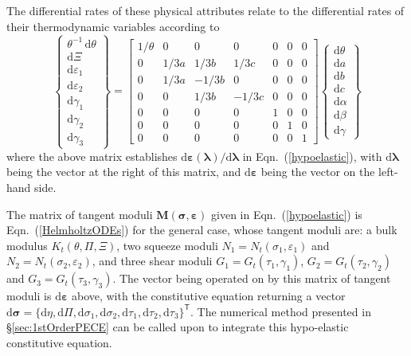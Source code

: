 The differential rates of these physical attributes relate to the differential rates of their thermo\-dynamic variables according to
\begin{equation}
    \left\{ \begin{matrix}
    \theta^{-1} \, \mathrm{d} \theta \\ \mathrm{d} \Xi \\ \mathrm{d} \varepsilon_1 \\
    \mathrm{d} \varepsilon_2 \\ \mathrm{d} \gamma_1 \\ \mathrm{d} \gamma_2 \\
    \mathrm{d} \gamma_3
    \end{matrix} \right\} = \begin{bmatrix}
    1 / \theta & 0 & 0 & 0 & 0 & 0 & 0 \\
    0 & 1/3a & 1/3b & 1/3c & 0 & 0 & 0 \\
    0 & 1/3a & -1/3b & 0 & 0 & 0 & 0 \\
    0 & 0 & 1/3b & -1/3c & 0 & 0 & 0 \\
    0 & 0 & 0 & 0 & 1 & 0 & 0 \\
    0 & 0 & 0 & 0 & 0 & 1 & 0 \\
    0 & 0 & 0 & 0 & 0 & 0 & 1
    \end{bmatrix} \left\{ \begin{matrix}
    \mathrm{d} \theta \\ \mathrm{d} a \\ \mathrm{d} b \\ \mathrm{d} c \\
    \mathrm{d} \alpha \\ \mathrm{d} \beta \\ \mathrm{d} \gamma
    \end{matrix} \right\}
\end{equation}
where the above matrix establishes $\mathrm{d} \boldsymbol{\varepsilon} ( \boldsymbol{\lambda} ) / \mathrm{d} \boldsymbol{\lambda}$ in Eqn.~(\ref{hypoelastic}), with $\mathrm{d} \boldsymbol{\lambda}$ being the vector at the right of this matrix, and $\mathrm{d} \boldsymbol{\varepsilon}$ being the vector on the left-hand side. 

The matrix of tangent moduli $\mathbf{M} ( \boldsymbol{\sigma} , \boldsymbol{\varepsilon} )$ given in Eqn.~(\ref{hypoelastic}) is Eqn.~(\ref{HelmholtzODEs}) for the general case, whose tangent moduli are: a bulk modulus $K_t (\theta , \Pi , \Xi)$, two squeeze moduli $N_1 = N_t ( \sigma_1 , \varepsilon_1 )$ and $N_2 = N_t ( \sigma_2 , \varepsilon_2 )$, and three shear moduli $G_1 = G_t ( \tau_1 , \gamma_1 )$, $G_2 = G_t ( \tau_2 , \gamma_2 )$ and $G_3 = G_t ( \tau_3 , \gamma_3 )$.  The vector being operated on by this matrix of tangent moduli is $\mathrm{d} \boldsymbol{\varepsilon}$ above, with the constitutive equation returning a vector $\mathrm{d} \boldsymbol{\sigma} = \{ \mathrm{d} \eta , \mathrm{d} \Pi , \mathrm{d} \sigma_1 , \mathrm{d} \sigma_2 , \mathrm{d} \tau_1 , \mathrm{d} \tau_2 , \mathrm{d} \tau_3 \}^{\mathsf{T}}$.  The numerical method presented in \S\ref{sec:1stOrderPECE} can be called upon to integrate this hypo-elastic constitutive equation.  

